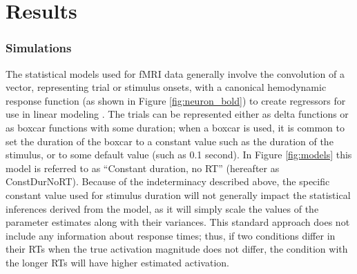 \documentclass[titlepage,12pt] {article}
\begin{document}
\section*{Results}

\subsubsection*{Simulations}

The statistical models used for fMRI data generally involve the convolution of a vector, representing trial or stimulus onsets, with a canonical hemodynamic response function (as shown in Figure \ref{fig:neuron_bold})  to create regressors for use in linear modeling \citep{PoldrackMumfordNichols2009}.  The trials can be represented either as delta functions or as boxcar functions with some duration; when a boxcar is used, it is common to set the duration of the boxcar to a constant value such as the duration of the stimulus, or to some default value (such as 0.1 second).  In Figure \ref{fig:models} this model is referred to as ``Constant duration, no RT'' (hereafter as ConstDurNoRT).  Because of the indeterminacy described above, the specific constant value used for stimulus duration will not generally impact the statistical inferences derived from the model, as it will simply scale the values of the parameter estimates along with their variances.   This standard approach does not include any information about response times; thus, if two conditions differ in their RTs when the true activation magnitude does not differ, the condition with the longer RTs will have higher estimated activation.  
\end{document}
